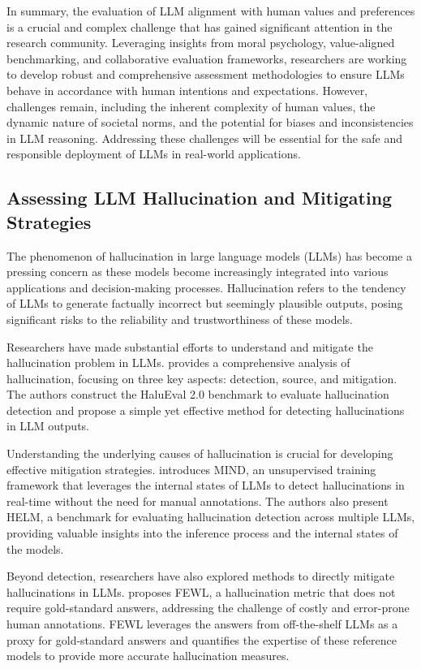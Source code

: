 \documentclass[11pt]{article}
\begin{document}
In summary, the evaluation of LLM alignment with human values and preferences is a crucial and complex challenge that has gained significant attention in the research community. Leveraging insights from moral psychology, value-aligned benchmarking, and collaborative evaluation frameworks, researchers are working to develop robust and comprehensive assessment methodologies to ensure LLMs behave in accordance with human intentions and expectations. However, challenges remain, including the inherent complexity of human values, the dynamic nature of societal norms, and the potential for biases and inconsistencies in LLM reasoning. Addressing these challenges will be essential for the safe and responsible deployment of LLMs in real-world applications.

\subsection{Assessing LLM Hallucination and Mitigating Strategies}

The phenomenon of hallucination in large language models (LLMs) has become a pressing concern as these models become increasingly integrated into various applications and decision-making processes. Hallucination refers to the tendency of LLMs to generate factually incorrect but seemingly plausible outputs, posing significant risks to the reliability and trustworthiness of these models.

Researchers have made substantial efforts to understand and mitigate the hallucination problem in LLMs. \cite{ref170} provides a comprehensive analysis of hallucination, focusing on three key aspects: detection, source, and mitigation. The authors construct the HaluEval 2.0 benchmark to evaluate hallucination detection and propose a simple yet effective method for detecting hallucinations in LLM outputs.

Understanding the underlying causes of hallucination is crucial for developing effective mitigation strategies. \cite{ref171} introduces MIND, an unsupervised training framework that leverages the internal states of LLMs to detect hallucinations in real-time without the need for manual annotations. The authors also present HELM, a benchmark for evaluating hallucination detection across multiple LLMs, providing valuable insights into the inference process and the internal states of the models.

Beyond detection, researchers have also explored methods to directly mitigate hallucinations in LLMs. \cite{ref172} proposes FEWL, a hallucination metric that does not require gold-standard answers, addressing the challenge of costly and error-prone human annotations. FEWL leverages the answers from off-the-shelf LLMs as a proxy for gold-standard answers and quantifies the expertise of these reference models to provide more accurate hallucination measures.
\end{document}
